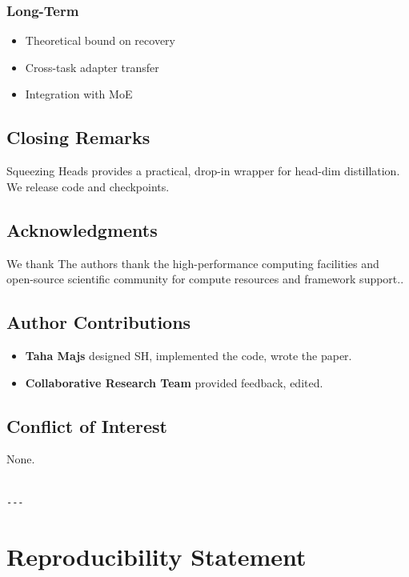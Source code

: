 \subsubsection{Long-Term}
\begin{itemize}
\item Theoretical bound on recovery
\item Cross-task adapter transfer
\item Integration with MoE

\end{itemize}
\subsection{Closing Remarks}

Squeezing Heads provides a practical, drop-in wrapper for head-dim 
distillation. We release code and checkpoints.

\subsection{Acknowledgments}

We thank The authors thank the high-performance computing facilities and open-source scientific community for compute resources and framework support..

\subsection{Author Contributions}

\begin{itemize}
\item \textbf{Taha Majs} designed SH, implemented the code, wrote the paper.
\item \textbf{Collaborative Research Team} provided feedback, edited.

\end{itemize}
\subsection{Conflict of Interest}

None.
\begin{lstlisting}

---
\end{lstlisting}


\section{Reproducibility Statement}

